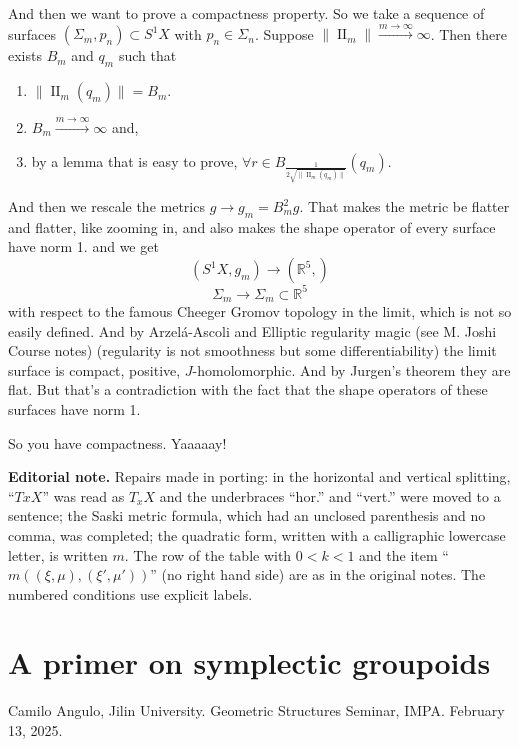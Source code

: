 And then we want to prove a compactness
property. So we take a sequence of surfaces
$(\Sigma_m,p_n)\subset S^1X$ with $p_n \in
\Sigma_n$. Suppose $\|\operatorname{I
I}_m\|\xrightarrow{m \to \infty}\infty$. Then
there exists $B_m$ and $q_m$ such that
\begin{enumerate}
\item[(i)] $\| \operatorname{ I
I}_m(q_m)\|=B_m$.
\item[(ii)] $B_m\xrightarrow{m \to
\infty}\infty$ and,
\item[(iii)] by a lemma that is easy to
prove, $\forall r\in
B_{\frac{1}{2\sqrt{\|\operatorname{I
I}_m(q_m)\|} }}(q_m)$.
\end{enumerate}
And then we rescale the metrics $g \to
g_m=B^2_mg$. That makes the metric be flatter
and flatter, like zooming in, and also makes
the shape operator of every surface have norm
1. and we get
$$
(S^1X,g_m)\longrightarrow(\mathbb{R}^5,)
$$
$$
\Sigma_m\longrightarrow \Sigma_m
\subset\mathbb{R}^5
$$
with respect to the famous Cheeger Gromov
topology in the limit, which is not so easily
defined. And by Arzelá-Ascoli and Elliptic
regularity magic (see M. Joshi Course notes)
(regularity is not smoothness but some
differentiability) the limit surface is
compact, positive, $J$-homolomorphic. And by
Jurgen's theorem they are flat. But that's a
contradiction with the fact that the shape
operators of these surfaces have norm 1.

So you have compactness. Yaaaaay!

\medskip\noindent
{\bf Editorial note.} Repairs made in
porting: in the horizontal and vertical
splitting, ``$TxX$'' was read as $T_xX$ and
the underbraces ``hor.'' and ``vert.'' were
moved to a sentence; the Saski metric
formula, which had an unclosed parenthesis
and no comma, was completed; the quadratic
form, written with a calligraphic lowercase
letter, is written $m$. The row of the
table with $0<k<1$ and the item
``$m((\xi,\mu),(\xi',\mu'))$'' (no right
hand side) are as in the original notes.
The numbered conditions use explicit labels.

\section{A primer on symplectic groupoids}
\label{section-prime-sympl-group}

\noindent
Camilo Angulo, Jilin University.
Geometric Structures Seminar, IMPA.
February 13, 2025.

